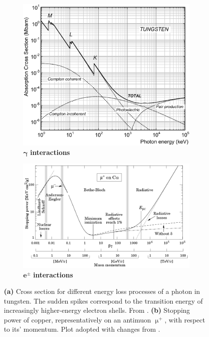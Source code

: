 \begin{figure}
	\begin{subfigure}[b]{0.425\textwidth}
		\centering
		\includegraphics[width=\textwidth]{./plots/photon_cross_section.png}
		\caption{$\mathbf{\gamma}$\textbf{ interactions}}
		\label{fig:gamma-interactions}
	\end{subfigure}
	\hfill
	\begin{subfigure}[b]{0.575\textwidth}
		\centering
		\includegraphics[width=\textwidth]{./plots/electron_ionisation_loss.png}
		\caption{$\mathbf{e^\pm}$\textbf{ interactions}}
		\label{fig:electron-interactions}
	\end{subfigure}
	\caption{\textbf{(a)} Cross section for different energy loss processes of a photon in tungsten. The sudden spikes correspond to the transition energy of 
	increasingly higher-energy electron shells. From \cite{chen2007interactions}. \textbf{(b)} Stopping power of copper, representatively on an antimuon $\upmu^+$, 
	with respect to its' momentum. Plot adopted with changes from \cite{meroli2017straggling}.}
	\label{fig:ionization-losses}
\end{figure}

